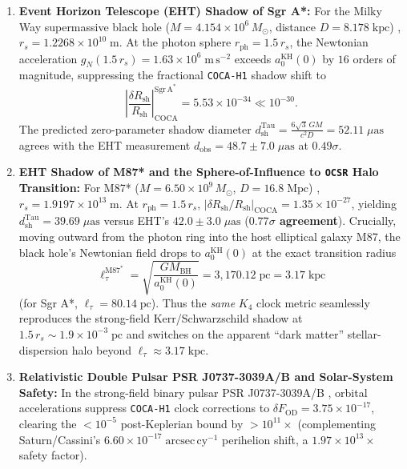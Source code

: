 \documentclass[11pt,a4paper]{article}
\theoremstyle{remark}
\begin{document}
\begin{enumerate}
  \item \textbf{Event Horizon Telescope (EHT) Shadow of Sgr A*:} For the Milky Way supermassive black hole ($M = 4.154 \times 10^6\,M_\odot$, distance $D = 8.178\;\mathrm{kpc}$) \cite{EHTSgrAPaperI2022}, $r_s = 1.2268 \times 10^{10}\;\mathrm{m}$. At the photon sphere $r_{\mathrm{ph}} = 1.5\,r_s$, the Newtonian acceleration $g_N(1.5\,r_s) = 1.63 \times 10^6\;\mathrm{m\,s^{-2}}$ exceeds $a_0^{\mathrm{KH}}(0)$ by $16$ orders of magnitude, suppressing the fractional \texttt{COCA-H1} shadow shift to
  \begin{equation}
    \left|\frac{\delta R_{\mathrm{sh}}}{R_{\mathrm{sh}}}\right|_{\mathrm{COCA}}^{\mathrm{Sgr\,A^*}} = 5.53 \times 10^{-34} \ll 10^{-30}.
    \label{eq:sgr_a_shadow}
  \end{equation}
  The predicted zero-parameter shadow diameter $d_{\mathrm{sh}}^{\mathrm{Tau}} = \frac{6\sqrt{3}\,GM}{c^2 D} = 52.11\;\mu\mathrm{as}$ agrees with the EHT measurement $d_{\mathrm{obs}} = 48.7 \pm 7.0\;\mu\mathrm{as}$ at \textbf{$0.49\sigma$}.
  \item \textbf{EHT Shadow of M87* and the Sphere-of-Influence to \texttt{OCSR} Halo Transition:} For M87* ($M = 6.50 \times 10^9\,M_\odot$, $D = 16.8\;\mathrm{Mpc}$) \cite{EHTM87PaperI2019}, $r_s = 1.9197 \times 10^{13}\;\mathrm{m}$. At $r_{\mathrm{ph}} = 1.5\,r_s$, $|\delta R_{\mathrm{sh}}/R_{\mathrm{sh}}|_{\mathrm{COCA}} = 1.35 \times 10^{-27}$, yielding $d_{\mathrm{sh}}^{\mathrm{Tau}} = 39.69\;\mu\mathrm{as}$ versus EHT's $42.0 \pm 3.0\;\mu\mathrm{as}$ (\textbf{$0.77\sigma$ agreement}). Crucially, moving outward from the photon ring into the host elliptical galaxy M87, the black hole's Newtonian field drops to $a_0^{\mathrm{KH}}(0)$ at the exact transition radius
  \begin{equation}
    \ell_\tau^{\mathrm{M87^*}} = \sqrt{\frac{G M_{\mathrm{BH}}}{a_0^{\mathrm{KH}}(0)}} = 3,170.12\;\mathrm{pc} = 3.17\;\mathrm{kpc}
    \label{eq:m87_ell_tau}
  \end{equation}
  (for Sgr A*, $\ell_\tau = 80.14\;\mathrm{pc}$). Thus the \emph{same} $K_4$ clock metric seamlessly reproduces the strong-field Kerr/Schwarzschild shadow at $1.5\,r_s \sim 1.9 \times 10^{-3}\;\mathrm{pc}$ and switches on the apparent ``dark matter'' stellar-dispersion halo beyond $\ell_\tau \approx 3.17\;\mathrm{kpc}$.
  \item \textbf{Relativistic Double Pulsar PSR J0737-3039A/B and Solar-System Safety:} In the strong-field binary pulsar PSR J0737-3039A/B \cite{Kramer2021DoublePulsar}, orbital accelerations suppress \texttt{COCA-H1} clock corrections to $\delta F_{\mathrm{OD}} = 3.75 \times 10^{-17}$, clearing the $< 10^{-5}$ post-Keplerian bound by $> 10^{11}\times$ (complementing Saturn/Cassini's $6.60 \times 10^{-17}\;\mathrm{arcsec\,cy^{-1}}$ perihelion shift, a $1.97 \times 10^{13}\times$ safety factor).

\end{enumerate}
\end{document}
